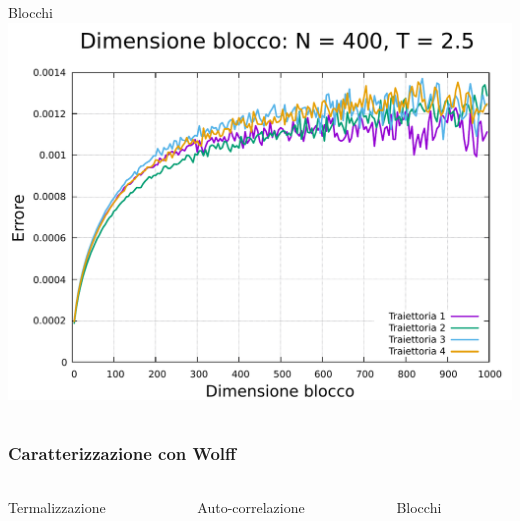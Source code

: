 \begin{frame}
\begin{columns}
\begin{column}{0.33\textwidth}
\begin{block}{Blocchi}
                \centering
                \includegraphics[width=\textwidth]{Immagini/simIsing2D/err_400_2.5.pdf}
            \end{block}        
        \end{column}
    \end{columns}
\end{frame}



\begin{frame}
    \frametitle{Caratterizzazione con Wolff}
    \framesubtitle{}

    \begin{columns}
        \begin{column}{0.33\textwidth}
            \begin{block}{Termalizzazione}
            
            \end{block}
        \end{column}
    
        \begin{column}{0.33\textwidth}
            \begin{block}{Auto-correlazione}

            \end{block}
        \end{column}

        \begin{column}{0.33\textwidth}
            \begin{block}{Blocchi}

            \end{block}        
        \end{column}
    \end{columns}
\end{frame}



